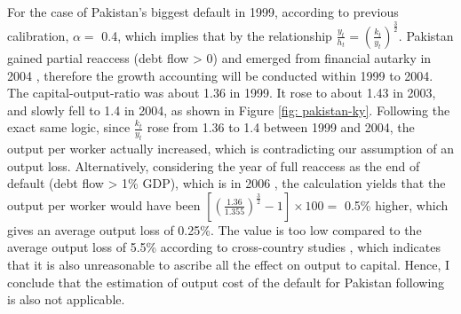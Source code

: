 For the case of Pakistan's biggest default in 1999, according to previous calibration, $\alpha=$ 0.4, which implies that by the relationship $\frac{y_t}{h_t} = \left( \frac{k_t}{y_t} \right)^{\frac{3}{2}}$.
Pakistan gained partial reaccess (debt flow > 0) and emerged from financial autarky in 2004 \citep{trebesch-2011-sovereign}, therefore the growth accounting will be conducted within 1999 to 2004.
The capital-output-ratio was about 1.36 in 1999. It rose to about 1.43 in 2003, and slowly fell to 1.4 in 2004, as shown in Figure \ref{fig: pakistan-ky}.
Following the exact same logic, since $\frac{k_t}{y_t}$ rose from 1.36 to 1.4 between 1999 and 2004, the output per worker actually increased, which is contradicting our assumption of an output loss.
Alternatively, considering the year of full reaccess as the end of default (debt flow > 1\% GDP), which is in 2006 \citep{trebesch-2011-sovereign}, the calculation yields that the output per worker would have been $ \left[\left(\frac{1.36}{1.355} \right)^{\frac{3}{2}} -1\right]\times 100 = $ 0.5\% higher, which gives an average output loss of 0.25\%. The value is too low compared to the average output loss of 5.5\% according to cross-country studies \citep{Uribe-Schmitt-Grohe-textbook,Borensztein-Panizza-defualt-cost}, which indicates that it is also unreasonable to ascribe all the effect on output to capital.
Hence, I conclude that the estimation of output cost of the default for Pakistan following \citet{zarazaga-12} is also not applicable.


